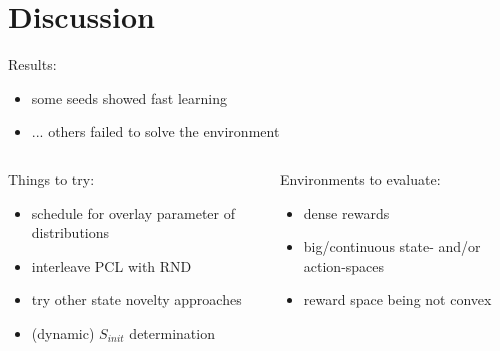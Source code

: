\documentclass[aspectratio=169]{beamer}
\begin{document}
\section{Discussion}
\begin{frame}
  Results:
  \begin{itemize}
    \item some seeds showed fast learning
    \item ... others failed to solve the environment
  \end{itemize}
  \vfill
  \begin{columns}[T]
    \begin{column}{0.48\textwidth}
      Things to try:
      \begin{itemize}
        \item schedule for overlay parameter of distributions
        \item interleave PCL with RND
        \item try other state novelty approaches
        \item (dynamic) $S_{init}$ determination
      \end{itemize}
    \end{column}
    \begin{column}{0.48\textwidth}
      Environments to evaluate:
      \begin{itemize}
        \item dense rewards
        \item big/continuous state- and/or action-spaces
        \item reward space being not convex
      \end{itemize}
    \end{column}
  \end{columns}
\end{frame}
\end{document}
